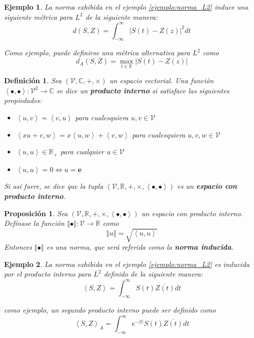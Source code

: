 \documentclass[12pt,letterpaper,draft]{book}
\newtheorem{definicion}{Definición}[chapter]
\newtheorem{proposicion}[teorema]{Proposición}
\newtheorem{ejemplo}{Ejemplo}[chapter]
\newcommand{\R}{\mathbb{R}}
\newcommand{\C}{\mathbb{C}}
\newcommand{\intR}{\int_{-\infty}^{\infty}}
\newcommand{\abso}[1]{\left| #1 \right|}
\newcommand{\norma}[1]{\left\Vert #1 \right\Vert}
\newcommand{\producto}[1]{\left\langle #1 \right\rangle}
\begin{document}
\begin{ejemplo}
La norma exhibida en el ejemplo \ref{ejemplo:norma_L2} induce una siguiente métrica para $L^{2}$ de la siguiente manera:
\begin{equation}
d(S,Z) = \intR \abso{S(t) - Z(z)}^{2} dt
\end{equation}

Como ejemplo, puede definirse una métrica alternativa para $L^{2}$ como
\begin{equation}
d_A(S,Z) = \max_{t \in \R} \abso{S(t) - Z(z)}
\end{equation}
\end{ejemplo}

\begin{definicion}
Sea $(\mathcal{V},\C,+,\times)$ un espacio vectorial. Una función $\producto{\bullet,\bullet} : \mathcal{V}^{2}\rightarrow \C$ se dice un \textbf{producto interno} si satisface las siguientes propiedades:
\begin{itemize}
\item $\producto{u,v} = \overline{\producto{v,u}}$ para cualesquiera $u,v \in \mathcal{V}$
\item $\producto{x u + v, w} = x \producto{u,w} + \producto{v,w}$ para cualesquiera $u,v,w \in \mathcal{V}$
\item $\producto{u,u} \in \R_+$ para cualquier $u \in \mathcal{V}$
\item $\producto{u,u} = 0 \Leftrightarrow u = \boldsymbol{e}$
\end{itemize}
Si así fuere, se dice que la tupla $(\mathcal{V},\R,+,\times, \producto{\bullet,\bullet})$ es un \textbf{espacio con producto interno}.
\end{definicion}

\begin{proposicion}
Sea $(\mathcal{V},\R,+,\times, \producto{\bullet,\bullet})$ un espacio con producto interno. Defínase la función $\norma{\bullet}: \mathcal{V} \rightarrow \R$ como
\begin{equation}
\norma{u} = \sqrt{\producto{u,u}}
\end{equation}
Entonces $\norma{\bullet}$ es una norma, que será referida como la \textbf{norma inducida}.
\end{proposicion}

\begin{ejemplo}
La norma exhibida en el ejemplo \ref{ejemplo:norma_L2} es inducida por el producto interno para $L^{2}$ definido de la siguiente manera:
\begin{equation}
\producto{S,Z} = \intR S(t) \overline{Z(t)} dt
\end{equation}

como ejemplo, un segundo producto interno puede ser definido como
\begin{equation}
\producto{S,Z}_A = \intR e^{-\abso{t}} S(t) \overline{Z(t)} dt
\end{equation}
\end{ejemplo}
\end{document}
